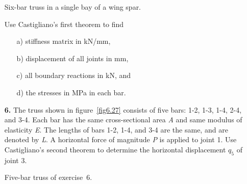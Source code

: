 \documentclass{AeroStructure-ERJohnson}
\begin{document}
\begin{exercise}
\begin{enumerate}[\textbf{2.}]
{\floataboveskip=-1pc
\floatbelowskip=-0.6pc
{\caption{Six-bar truss in a single bay of a wing spar.\label{fig6.26}}}}

\vspace*{-10pt}

Use Castigliano's first theorem to find
\begin{enumerate}[b)]
\item[{\hskip13pt}a)] stiffness matrix in kN/mm,
\item[{\hskip13pt}b)] displacement of all joints in mm,
\item[{\hskip13pt}c)] all boundary reactions in kN, and
\item[{\hskip13pt}d)] the stresses in MPa in each bar.
\end{enumerate}

\item[\textbf{6.}] The truss shown in figure~\ref{fig6.27} consists of five bars: 1-2, 1-3, 1-4, 2-4, and 3-4. Each bar has the same cross-sectional area \textit{A} and same modulus of elasticity \textit{E}. The lengths of bars 1-2, 1-4, and 3-4 are the same, and are denoted by \textit{L}. A horizontal force of magnitude \textit{P} is applied to joint 1. Use Castigliano's second theorem to determine the horizontal displacement $q_5$ of joint 3.

{\floatbelowskip=-0.8pc
{\caption{Five-bar truss of exercise~6.\label{fig6.27}}}}


\end{enumerate}
\end{exercise}
\end{document}
